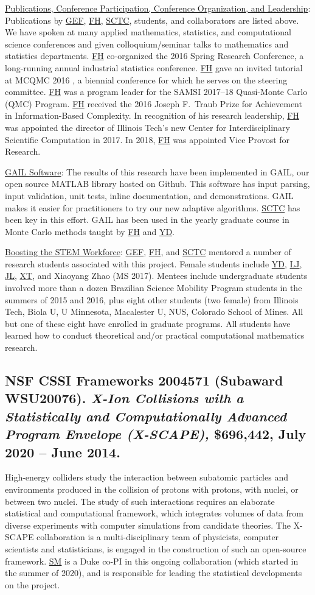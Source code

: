 \documentclass[11pt]{NSFamsart}
\newcommand{\Upara}[1]{\noindent\underline{#1}:\xspace}
\newcommand{\FH}{\hyperlink{FHlink}{FH}\xspace}
\newcommand{\SM}{\hyperlink{SMlink}{SM}\xspace}
\newcommand{\SCTC}{\hyperlink{SCTClink}{SCTC}\xspace}
\newcommand{\GEF}{\hyperlink{GEFlink}{GEF}\xspace}
\newcommand{\YD}{\hyperlink{YDlink}{YD}\xspace}
\newcommand{\LJ}{\hyperlink{LJlink}{LJ}\xspace}
\newcommand{\XT}{\hyperlink{XTlink}{XT}\xspace}
\newcommand{\JL}{\hyperlink{JLlink}{JL}\xspace}
\newcommand{\GAIL}{GAIL\xspace}
\newcommand{\MATLAB}{MATLAB\xspace}
\newcommand{\Rlang}{R\xspace}
\begin{document}
\Upara{Publications, Conference Participation, Conference Organization, and Leadership} Publications by \GEF, \FH,  \SCTC, students, and collaborators are listed above.  We have spoken at many applied mathematics, statistics,
and computational science conferences and given colloquium/seminar talks to mathematics and
statistics departments.  \FH co-organized the
2016 Spring Research
Conference, a long-running annual industrial statistics conference.   \FH gave an invited tutorial
at MCQMC 2016
\cite{Hic17a}, a biennial conference for which he serves on the steering committee.  \FH
was a program leader for the SAMSI 2017--18 Quasi-Monte Carlo (QMC) Program.   \FH received the 2016 Joseph F.\ Traub Prize for Achievement in Information-Based Complexity. In recognition of his research leadership, \FH was appointed the director of Illinois Tech's new Center for Interdisciplinary
Scientific Computation in 2017.  In 2018, \FH was appointed Vice Provost for Research.

\Upara{\GAIL Software} The results of this research have been implemented in
\GAIL, our open source \MATLAB library hosted on
Github. This software
has input parsing, input validation, unit tests, inline documentation, and
demonstrations.  \GAIL makes it easier for practitioners to try our new adaptive algorithms.  \SCTC has been key in this effort.  \GAIL has been used in the yearly graduate course in Monte Carlo methods taught by \FH and \YD.

\Upara{Boosting the STEM Workforce} \GEF, \FH, and \SCTC mentored a number of
research students associated with this project.  Female students include \YD, \LJ, \JL, \XT, and Xiaoyang Zhao (MS 2017).   Mentees include undergraduate students involved more than a dozen
Brazilian Science Mobility Program students in the summers of 2015 and 2016, plus eight other students (two female) from Illinois Tech, Biola U, U Minnesota, Macalester U, NUS, Colorado School of Mines.  All but one of these eight have enrolled in graduate programs.   All students have learned how to conduct theoretical and/or practical computational mathematics research.

\subsection{NSF CSSI Frameworks 2004571 (Subaward WSU20076). \textit{X-Ion Collisions with a Statistically and Computationally Advanced Program Envelope (X-SCAPE),} \$696,442, July 2020 -- June 2014.} High-energy colliders study the interaction between subatomic particles and environments produced in the collision of protons with protons, with nuclei, or between two nuclei. The study of such interactions requires an elaborate statistical and computational framework, which integrates volumes of data from diverse experiments with computer simulations from candidate theories. The X-SCAPE collaboration is a multi-disciplinary team of physicists, computer scientists and statisticians, is engaged in the construction of such an open-source framework. \SM is a Duke co-PI in this ongoing collaboration (which started in the summer of 2020), and is responsible for leading the statistical developments on the project.
\end{document}
